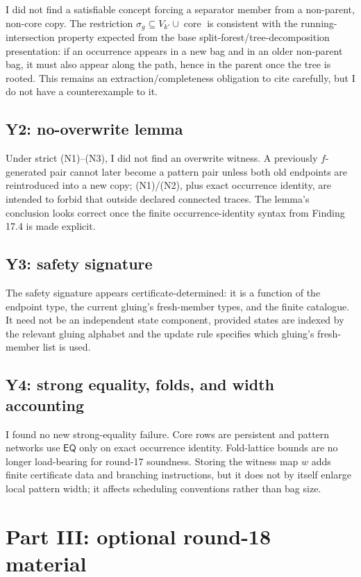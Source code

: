\documentclass[11pt]{article}
\newcommand{\EQ}{\mathsf{EQ}}
\newcommand{\core}{\operatorname{core}}
\begin{document}
I did not find a satisfiable concept forcing a separator member from a non-parent, non-core copy.  The restriction $\sigma_g\subseteq V_{k'}\cup\core$ is consistent with the running-intersection property expected from the base split-forest/tree-decomposition presentation: if an occurrence appears in a new bag and in an older non-parent bag, it must also appear along the path, hence in the parent once the tree is rooted.  This remains an extraction/completeness obligation to cite carefully, but I do not have a counterexample to it.

\subsection{Y2: no-overwrite lemma}

Under strict (N1)--(N3), I did not find an overwrite witness.  A previously $f$-generated pair cannot later become a pattern pair unless both old endpoints are reintroduced into a new copy; (N1)/(N2), plus exact occurrence identity, are intended to forbid that outside declared connected traces.  The lemma's conclusion looks correct once the finite occurrence-identity syntax from Finding 17.4 is made explicit.

\subsection{Y3: safety signature}

The safety signature appears certificate-determined: it is a function of the endpoint type, the current gluing's fresh-member types, and the finite catalogue.  It need not be an independent state component, provided states are indexed by the relevant gluing alphabet and the update rule specifies which gluing's fresh-member list is used.

\subsection{Y4: strong equality, folds, and width accounting}

I found no new strong-equality failure.  Core rows are persistent and pattern networks use $\EQ$ only on exact occurrence identity.  Fold-lattice bounds are no longer load-bearing for round-17 soundness.  Storing the witness map $w$ adds finite certificate data and branching instructions, but it does not by itself enlarge local pattern width; it affects scheduling conventions rather than bag size.

\section{Part III: optional round-18 material}
\end{document}
